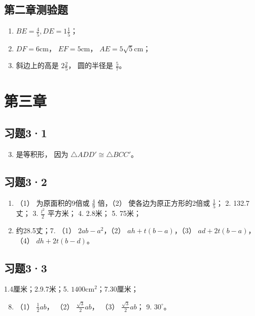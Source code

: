 \subsection{第二章测验题}

\begin{enumerate}
\item
  \(BE = \frac{4}{5}, DE = 1\frac{1}{5}\)；
\item
  \(DF = 6\mathrm{cm}\)， \(EF = 5\mathrm{cm}\)，
  \(AE = 5\sqrt{5}\mathrm{cm}\)；
\item
  斜边上的高是 \(2\frac{2}{5}\)， 圆的半径是 \(\frac{5}{7}\)。
\end{enumerate}

\section{第三章}

\subsection{习题3·1}

\begin{enumerate}
\setcounter{enumi}{2}
\item
  是等积形， 因为 \(\triangle ADD' \cong \triangle BCC'\)。
\end{enumerate}

\subsection{习题3·2}

\begin{enumerate}
\item
  （1） 为原面积的9倍或 \(\frac{4}{9}\) 倍，（2）
  使各边为原正方形的2倍或 \(\frac{1}{5}\)； 2. 132.7丈； 3.
  \(\frac{l^2}{2}\) 平方米； 4. 2.8米； 5. 75米；
\item
  约28.5丈；7. （1） \(2ab - a^2\)，（2） \(ah + t(b - a)\)，（3）
  \(ad + 2t(b - a)\)，（4） \(dh + 2t(b - d)\)。
\end{enumerate}

\subsection{习题3·3}

1.4厘米；2.9.7米；5. \(1400\mathrm{cm}^2\)；7.30厘米；

\begin{enumerate}
\setcounter{enumi}{7}
\item
  （1） \(\frac{1}{2} ab\)， （2） \(\frac{\sqrt{3}}{2} ab\)， （3）
  \(\frac{\sqrt{3}}{2} ab\)； 9. \(30^{\circ}\)。
\end{enumerate}

